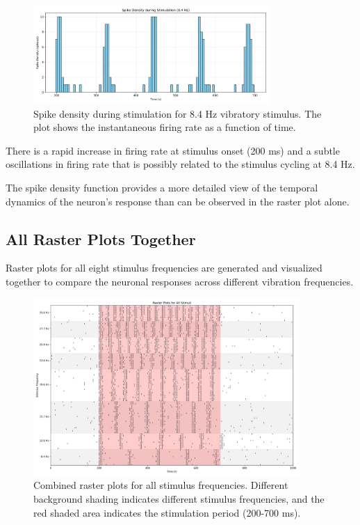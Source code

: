 \documentclass{article}
\begin{document}
\begin{figure}[H]
\centering
\includegraphics[width=0.8\textwidth]{Fig5.png}
\caption{Spike density during stimulation for 8.4 Hz vibratory stimulus. The plot shows the instantaneous firing rate as a function of time.}
\label{fig:spike_density}
\end{figure}

There is a rapid increase in firing rate at stimulus onset (200 ms) and a subtle oscillations in firing rate that is possibly related to the stimulus cycling at 8.4 Hz.
   
The spike density function provides a more detailed view of the temporal dynamics of the neuron's response than can be observed in the raster plot alone.

\subsection{All Raster Plots Together}

Raster plots for all eight stimulus frequencies are generated and visualized together to compare the neuronal responses across different vibration frequencies.


\begin{figure}[H]
\centering
\includegraphics[width=0.9\textwidth]{Fig6.png}
\caption{Combined raster plots for all stimulus frequencies. Different background shading indicates different stimulus frequencies, and the red shaded area indicates the stimulation period (200-700 ms).}
\label{fig:all_rasters}
\end{figure}
\end{document}
